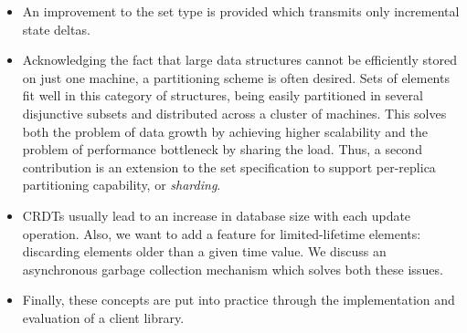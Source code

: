 \begin{itemize}
  \item An improvement to the set type is provided which
  transmits only incremental state deltas.
  \item Acknowledging the fact that large data structures cannot be efficiently
  stored on just one machine, a partitioning scheme is often desired. Sets of
  elements fit well in this category of structures, being easily partitioned in
  several disjunctive subsets and distributed across a cluster of machines.
  This solves both the problem of data growth by achieving higher scalability
  and the problem of performance bottleneck by sharing the load. Thus, a second
  contribution is an extension to the set specification to support per-replica
  partitioning capability, or \textit{sharding}.
  \item CRDTs usually lead to an increase in database size with each update
  operation. Also, we want to add a feature for limited-lifetime elements:
  discarding elements older than a given time value. We discuss an asynchronous
  garbage collection mechanism which solves both these issues.
  \item Finally, these concepts are put into practice through the implementation
  and evaluation of a client library.
\end{itemize}